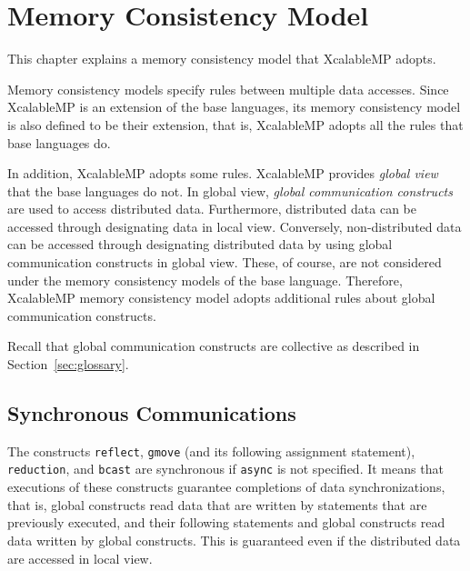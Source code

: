 

\chapter{Memory Consistency Model}



This chapter explains a memory consistency model that XcalableMP adopts.

Memory consistency models specify rules between multiple data
accesses.  Since XcalableMP is an extension of the base languages, its
memory consistency model is also defined to be their extension, that
is, XcalableMP adopts all the rules that base languages do.

In addition, XcalableMP adopts some rules.  XcalableMP provides
\emph{global view} that the base languages do not.  In global view,
\emph{global communication constructs} are used to access distributed
data.  Furthermore, distributed data can be accessed through
designating data in local view.  Conversely, non-distributed data can
be accessed through designating distributed data by using global
communication constructs in global view.  These, of course, are not
considered under the memory consistency models of the base language.
Therefore, XcalableMP memory consistency model adopts additional rules
about global communication constructs.

Recall that global communication constructs are collective as
described in Section~\ref{sec:glossary}.

\section{Synchronous Communications}

The constructs \texttt{reflect}, \texttt{gmove} (and its following
assignment statement), \texttt{reduction}, and \texttt{bcast} are
synchronous if \texttt{async} is not specified.  It means that
executions of these constructs guarantee completions of data
synchronizations, that is, global constructs read data that are
written by statements that are previously executed, and their
following statements and global constructs read data written by global
constructs.  This is guaranteed even if the distributed data are
accessed in local view.

